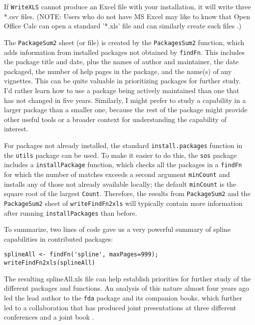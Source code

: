 If {\tt WriteXLS} cannot produce an Excel file with your
installation, it will write three *.csv files.  (NOTE:
Users who do not have MS Excel may like to know that
Open Office Calc can open a standard '*.xls' file and
can similarly create such files \citep{CALC09MAN}.)

The {\tt PackageSum2} sheet (or file) is created by the
{\tt PackagesSum2} function, which adds information from
installed packages not obtained by
{\tt findFn}.  This includes the package title and date, plus
the names of author and maintainer,
the date packaged, the number of help pages in the package,
and the name(s) of any vignettes.  This can be quite
valuable in prioritizing packages for further study.  I'd
rather learn how to use a package being actively maintained
than one that has not changed in five years.  Similarly,
I might prefer to study a capability in a larger package
than a smaller one, because the rest of the package might
provide other useful tools or a broader context for
understanding the capability of interest.

For packages not already installed, the standard
{\tt install.packages} function in the {\tt utils}
package can be used.  To make it easier to do this,
the {\tt sos} package includes a {\tt installPackage}
function, which checks all the packages in a
{\tt findFn} for which
the number of matches exceeds a second argument {\tt minCount}
and installs any of those not already available locally;  the
default {\tt minCount} is the square root of the largest
{\tt Count}.  Therefore, the results from {\tt PackageSum2} and the
{\tt PackageSum2} sheet of {\tt writeFindFn2xls} will typically
contain more information after running {\tt installPackages}
than before.

To summarize, two lines of code gave us a very powerful
summary of spline capabilities in contributed \R{}
packages:

\begin{verbatim}
splineAll <- findFn('spline', maxPages=999);
writeFindFn2xls(splineAll)
\end{verbatim}

The resulting splineAll.xls file can help establish priorities for further study of the
different packages and functions.  An analysis of this nature
almost four years ago led the lead author to the {\tt fda}
package and its companion books, which further led to a
collaboration that has produced joint presentations at three different
conferences and a joint book \citep{RHG09}.


